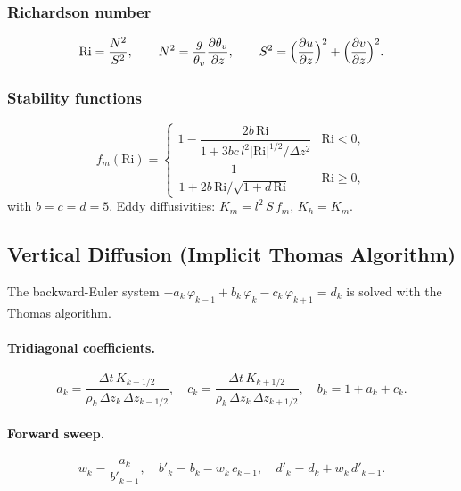 \documentclass[11pt,a4paper]{article}
\newcommand{\pp}{\partial}
\begin{document}
\subsubsection{Richardson number}
\begin{equation}
  \mathrm{Ri} = \frac{N^2}{S^2}, \qquad
  N^2 = \frac{g}{\theta_v}\frac{\pp\theta_v}{\pp z}, \qquad
  S^2 = \Bigl(\frac{\pp u}{\pp z}\Bigr)^2+\Bigl(\frac{\pp v}{\pp z}\Bigr)^2.
\end{equation}

\subsubsection{Stability functions}
\begin{equation}
  f_m(\mathrm{Ri}) = \begin{cases}
    1-\dfrac{2b\,\mathrm{Ri}}{1+3bc\,l^2|\mathrm{Ri}|^{1/2}/\Delta z^2} & \mathrm{Ri}<0,\\[6pt]
    \dfrac{1}{1+2b\,\mathrm{Ri}/\sqrt{1+d\,\mathrm{Ri}}} & \mathrm{Ri}\ge 0,
  \end{cases}
\end{equation}
with $b=c=d=5$.  Eddy diffusivities: $K_m=l^2\,S\,f_m$, $K_h=K_m$.

\subsection{Vertical Diffusion (Implicit Thomas Algorithm)}

The backward-Euler system $-a_k\,\varphi_{k-1}+b_k\,\varphi_k-c_k\,\varphi_{k+1}=d_k$ is solved with the Thomas algorithm.

\paragraph{Tridiagonal coefficients.}
\begin{equation}
  a_k = \frac{\Delta t\,K_{k-1/2}}{\rho_k\,\Delta z_k\,\Delta z_{k-1/2}}, \quad
  c_k = \frac{\Delta t\,K_{k+1/2}}{\rho_k\,\Delta z_k\,\Delta z_{k+1/2}}, \quad
  b_k = 1+a_k+c_k.
\end{equation}

\paragraph{Forward sweep.}
\begin{equation}
  w_k = \frac{a_k}{b'_{k-1}}, \quad b'_k = b_k-w_k\,c_{k-1}, \quad d'_k = d_k+w_k\,d'_{k-1}.
\end{equation}
\end{document}
